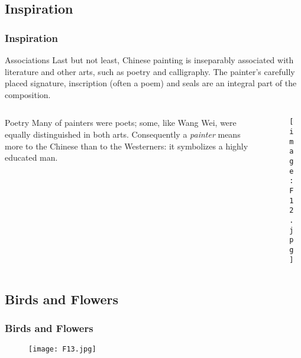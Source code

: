 \documentclass[pdflatex,compress,8pt,
	xcolor={dvipsnames,dvipsnames,svgnames,x11names,table},
	hyperref={	
	breaklinks = true, 
	pdfauthor={Lemenkova Polina}, 
	pdfsubject={Preentation}, 
	pdfcreator={Lemenkova Polina}, 
	pdfproducer={Lemenkova Polina}, 
	colorlinks=true,
	linkcolor=NavyBlue, 
	citecolor=NavyBlue, 
	urlcolor = NavyBlue, 
	breaklinks = true}]{beamer}
\begin{document}
\subsection{Inspiration}
\begin{frame}\frametitle{Inspiration}
\footnotesize{
	\begin{alertblock}{Associations}
	Last but not least, Chinese painting is inseparably associated with literature and other arts, such as poetry and calligraphy. The painter’s carefully placed signature, inscription (often a poem) and seals are an integral part of the composition.
	\end{alertblock}

\begin{minipage}[0.4\textheight]{\textwidth}
		\begin{columns}[T]
			\begin{column}{0.2\textwidth}
	\begin{block}{Poetry}
	Many of painters were poets; some, like Wang Wei, were equally distinguished in both arts. Consequently a \emph{painter} means more to the Chinese than to the Westerners: it symbolizes a highly educated man.
	\end{block}
			\end{column}
			\begin{column}{0.8\textwidth}
				\begin{figure}[H]
					\centering
						\texttt{[image: F12.jpg]}
				\end{figure}
			\end{column}
		\end{columns}
	\end{minipage}
}	

\end{frame}

\subsection{Birds and Flowers}
\begin{frame}\frametitle{Birds and Flowers}
\begin{figure}[H]
	\centering
		\texttt{[image: F13.jpg]}
\end{figure}
\end{frame}
\end{document}

